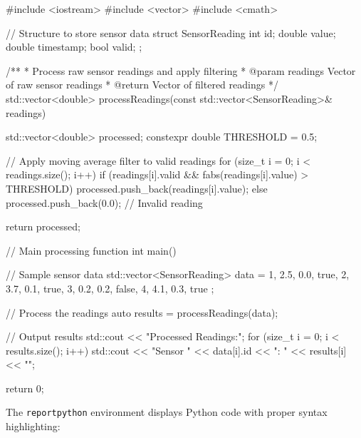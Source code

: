 \documentclass[titlecase]{capstone_report}
\begin{document}
\begin{reportcpp}[caption=Example C++ Implementation]
#include <iostream>
#include <vector>
#include <cmath>

// Structure to store sensor data
struct SensorReading {
    int id;
    double value;
    double timestamp;
    bool valid;
};

/**
 * Process raw sensor readings and apply filtering
 * @param readings Vector of raw sensor readings
 * @return Vector of filtered readings
 */
std::vector<double> processReadings(const std::vector<SensorReading>& readings) {
    std::vector<double> processed;
    constexpr double THRESHOLD = 0.5;
    
    // Apply moving average filter to valid readings
    for (size_t i = 0; i < readings.size(); i++) {
        if (readings[i].valid && fabs(readings[i].value) > THRESHOLD) {
            processed.push_back(readings[i].value);
        } else {
            processed.push_back(0.0);  // Invalid reading
        }
    }
    
    return processed;
}

// Main processing function
int main() {
    // Sample sensor data
    std::vector<SensorReading> data = {
        {1, 2.5, 0.0, true},
        {2, 3.7, 0.1, true},
        {3, 0.2, 0.2, false},
        {4, 4.1, 0.3, true}
    };
    
    // Process the readings
    auto results = processReadings(data);
    
    // Output results
    std::cout << "Processed Readings:\n";
    for (size_t i = 0; i < results.size(); i++) {
        std::cout << "Sensor " << data[i].id << ": " 
                  << results[i] << "\n";
    }
    
    return 0;
}
\end{reportcpp}


The \texttt{reportpython} environment displays Python code with proper syntax highlighting:
\end{document}

